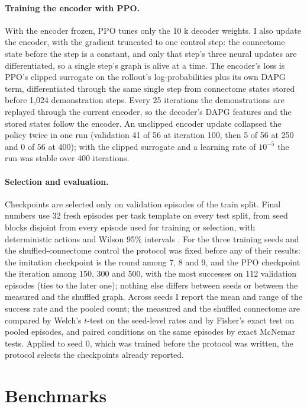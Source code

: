 \documentclass[10pt,twocolumn]{article}
\begin{document}
\paragraph{Training the encoder with PPO.}
With the encoder frozen, PPO tunes only the 10 k decoder weights.
I also update the encoder, with the gradient truncated to one control step: the connectome state before the step is a constant, and only that step's three neural updates are differentiated, so a single step's graph is alive at a time.
The encoder's loss is PPO's clipped surrogate on the rollout's log-probabilities plus its own DAPG term, differentiated through the same single step from connectome states stored before 1,024 demonstration steps.
Every 25 iterations the demonstrations are replayed through the current encoder, so the decoder's DAPG features and the stored states follow the encoder.
An unclipped encoder update collapsed the policy twice in one run (validation 41 of 56 at iteration 100, then 5 of 56 at 250 and 0 of 56 at 400); with the clipped surrogate and a learning rate of $10^{-5}$ the run was stable over 400 iterations.

\paragraph{Selection and evaluation.}
Checkpoints are selected only on validation episodes of the train split.
Final numbers use 32 fresh episodes per task template on every test split, from seed blocks disjoint from every episode used for training or selection, with deterministic actions and Wilson 95\% intervals \citep{wilson1927}.
For the three training seeds and the shuffled-connectome control the protocol was fixed before any of their results: the imitation checkpoint is the round among 7, 8 and 9, and the PPO checkpoint the iteration among 150, 300 and 500, with the most successes on 112 validation episodes (ties to the later one); nothing else differs between seeds or between the measured and the shuffled graph.
Across seeds I report the mean and range of the success rate and the pooled count; the measured and the shuffled connectome are compared by Welch's $t$-test on the seed-level rates and by Fisher's exact test on pooled episodes, and paired conditions on the same episodes by exact McNemar tests.
Applied to seed 0, which was trained before the protocol was written, the protocol selects the checkpoints already reported.

\section{Benchmarks}
\end{document}
